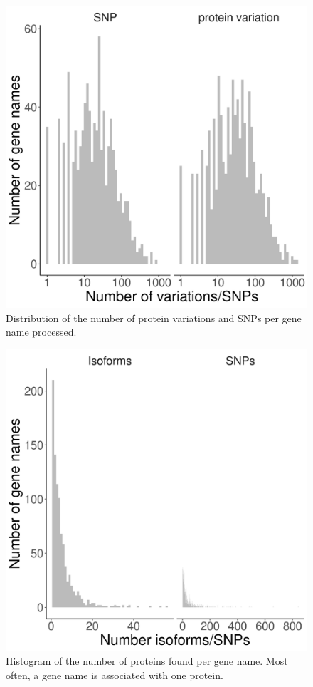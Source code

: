 \begin{figure}[!htbp]
  \includegraphics[width=\textwidth]{ncbi_peregrine_results/fig_snps_per_gene_name_processed.png}
  \caption{
    Distribution of the number of protein variations and SNPs per gene name processed.
  }
  \label{fig:snps_per_gene_name_processed}
\end{figure}

\begin{figure}[!htbp]
  \includegraphics[width=\textwidth]{ncbi_peregrine_results/fig_n_proteins_per_gene_name.png}
  \caption{
    Histogram of the number of proteins found per gene name.
    Most often, a gene name is associated with one protein.
  }
  \label{fig:n_proteins_per_gene_name}
\end{figure}



